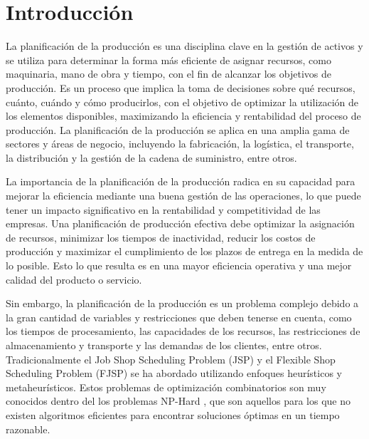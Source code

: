 \section{Introducción}
La planificación de la producción es una disciplina clave en la gestión de 
activos y se utiliza para determinar la forma más eficiente de asignar 
recursos, como maquinaria, mano de obra y tiempo, con el fin de alcanzar 
los objetivos de producción. Es un proceso que implica la toma de decisiones 
sobre qué recursos, cuánto, cuándo y cómo producirlos, con el objetivo de optimizar la 
utilización de los elementos disponibles, maximizando la eficiencia y rentabilidad 
del proceso de producción. La planificación de la producción se aplica en una 
amplia gama de sectores y áreas de negocio, incluyendo la fabricación, la logística, 
el transporte, la distribución y la gestión de la cadena de suministro, entre otros.\medskip

La importancia de la planificación de la producción radica en su capacidad para mejorar 
la eficiencia mediante una buena gestión de las operaciones, lo que puede tener un impacto 
significativo en la rentabilidad y competitividad de las empresas. Una planificación de 
producción efectiva debe optimizar la asignación de recursos, minimizar los tiempos de 
inactividad, reducir los costos de producción y maximizar el cumplimiento de los plazos 
de entrega en la medida de lo posible. Esto lo que resulta es en una mayor eficiencia operativa 
y una mejor calidad del producto o servicio.\medskip

Sin embargo, la planificación de la producción es un problema complejo debido a la gran 
cantidad de variables y restricciones que deben tenerse en cuenta, como los tiempos de 
procesamiento, las capacidades de los recursos, las restricciones de almacenamiento y 
transporte y las demandas de los clientes, entre otros. Tradicionalmente el Job Shop Scheduling 
Problem (JSP) y el Flexible Shop Scheduling Problem (FJSP) \cite{FJSP-article} se ha abordado 
utilizando enfoques heurísticos y metaheurísticos. Estos problemas de optimización combinatorios 
son muy conocidos dentro del los problemas NP-Hard \cite{Derivando_2017}, que son aquellos para 
los que no existen algoritmos eficientes para encontrar soluciones óptimas en un 
tiempo razonable.\medskip

